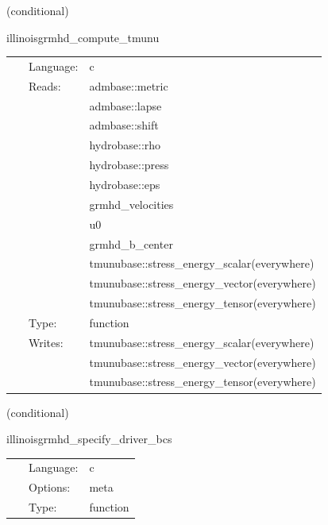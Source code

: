 \documentclass{article}
\begin{document}
\vspace{5mm}

   (conditional) 

\hspace{5mm} illinoisgrmhd\_compute\_tmunu 

\hspace{5mm}{\it compute stress-energy tensor } 


\hspace{5mm}

 \begin{tabular*}{160mm}{cll} 
~ & Language:  & c \\ 
~ & Reads:  & admbase::metric \\ 
~& ~ &admbase::lapse\\ 
~& ~ &admbase::shift\\ 
~& ~ &hydrobase::rho\\ 
~& ~ &hydrobase::press\\ 
~& ~ &hydrobase::eps\\ 
~& ~ &grmhd\_velocities\\ 
~& ~ &u0\\ 
~& ~ &grmhd\_b\_center\\ 
~& ~ &tmunubase::stress\_energy\_scalar(everywhere)\\ 
~& ~ &tmunubase::stress\_energy\_vector(everywhere)\\ 
~& ~ &tmunubase::stress\_energy\_tensor(everywhere)\\ 
~ & Type:  & function \\ 
~ & Writes:  & tmunubase::stress\_energy\_scalar(everywhere) \\ 
~& ~ &tmunubase::stress\_energy\_vector(everywhere)\\ 
~& ~ &tmunubase::stress\_energy\_tensor(everywhere)\\ 
\end{tabular*} 


\vspace{5mm}

   (conditional) 

\hspace{5mm} illinoisgrmhd\_specify\_driver\_bcs 

\hspace{5mm}{\it register boundary conditions with presync } 


\hspace{5mm}

 \begin{tabular*}{160mm}{cll} 
~ & Language:  & c \\ 
~ & Options:  & meta \\ 
~ & Type:  & function \\ 
\end{tabular*} 
\end{document}
